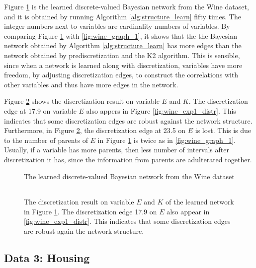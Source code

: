 Figure \ref{fig:wine_graph_2} is the learned discrete-valued Bayesian network from the Wine dataset, and it is obtained by running Algorithm \ref{alg:structure_learn} fifty times. The integer numbers next to variables are cardinality numbers of variables. By comparing Figure \ref{fig:wine_graph_2} with \ref{fig:wine_graph_1}, it shows that the the Bayesian network obtained by Algorithm \ref{alg:structure_learn} has more edges than the network obtained by prediscretization and the K2 algorithm. This is sensible, since when a network is learned along with discretization, variables have more freedom, by adjusting discretization edges, to construct the correlations with other variables and thus have more edges in the network.

Figure \ref{fig:wine_exp2_distr} shows the discretization result on variable $E$ and $K$. The discretization edge at \num{17.9} on variable $E$ also appers in Figure \ref{fig:wine_exp1_distr}. This indicates that some discretization edges are robust against the network structure. Furthermore, in Figure \ref{fig:wine_exp2_distr}, the discretization edge at \num{23.5} on $E$ is lost. This is due to the number of parents of $E$ in Figure \ref{fig:wine_graph_2} is twice as in \ref{fig:wine_graph_1}. Usually, if a variable has more parents, then less number of intervals after discretization it has, since the information from parents are adulterated together.

\begin{figure}[ht]
  \centering
  \scalebox{0.7}{
    }
  \caption{The learned discrete-valued Bayesian network from the Wine dataset }
  \label{fig:wine_graph_2}
\end{figure}

\begin{figure}[ht]
  \centering
  \begin{tabular}{cc}
    
 \end{tabular}
  \caption{The discretization result on variable $E$ and $K$ of the learned network in Figure \ref{fig:wine_graph_2}. The discretization edge \num{17.9} on $E$ also appear in \ref{fig:wine_exp1_distr}. This indicates that some discretization edges are robust again the network structure.}
  \label{fig:wine_exp2_distr}
\end{figure}

\subsection{Data 3: Housing}
\label{subsec:housing}

